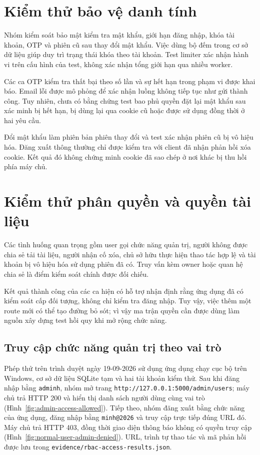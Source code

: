 \section{Kiểm thử bảo vệ danh tính}
Nhóm kiểm soát bảo mật kiểm tra mật khẩu, giới hạn đăng nhập, khóa tài khoản, OTP và phiên cũ sau thay đổi mật khẩu. Việc dùng bộ đếm trong cơ sở dữ liệu giúp duy trì trạng thái khóa theo tài khoản. Test limiter xác nhận hành vi trên cấu hình của test, không xác nhận tổng giới hạn qua nhiều worker.

Các ca OTP kiểm tra thất bại theo số lần và sự hết hạn trong phạm vi được khai báo. Email lỗi được mô phỏng để xác nhận luồng không tiếp tục như gửi thành công. Tuy nhiên, chưa có bằng chứng test bao phủ quyền đặt lại mật khẩu sau xác minh bị hết hạn, bị dùng lại qua cookie cũ hoặc được sử dụng đồng thời ở hai yêu cầu.

Đổi mật khẩu làm phiên bản phiên thay đổi và test xác nhận phiên cũ bị vô hiệu hóa. Đăng xuất thông thường chỉ được kiểm tra với client đã nhận phản hồi xóa cookie. Kết quả đó không chứng minh cookie đã sao chép ở nơi khác bị thu hồi phía máy chủ.

\section{Kiểm thử phân quyền và quyền tài liệu}
Các tình huống quan trọng gồm user gọi chức năng quản trị, người không được chia sẻ tải tài liệu, người nhận cố xóa, chủ sở hữu thực hiện thao tác hợp lệ và tài khoản bị vô hiệu hóa sử dụng phiên đã có. Truy vấn kèm owner hoặc quan hệ chia sẻ là điểm kiểm soát chính được đối chiếu.

Kết quả thành công của các ca hiện có hỗ trợ nhận định rằng ứng dụng đã có kiểm soát cấp đối tượng, không chỉ kiểm tra đăng nhập. Tuy vậy, việc thêm một route mới có thể tạo đường bỏ sót; vì vậy ma trận quyền cần được dùng làm nguồn xây dựng test hồi quy khi mở rộng chức năng.

\subsection{Truy cập chức năng quản trị theo vai trò}
Phép thử trên trình duyệt ngày 19-09-2026 sử dụng ứng dụng chạy cục bộ trên Windows, cơ sở dữ liệu SQLite tạm và hai tài khoản kiểm thử. Sau khi đăng nhập bằng \texttt{adminh}, nhóm mở trang \nolinkurl{http://127.0.0.1:5000/admin/users}; máy chủ trả HTTP 200 và hiển thị danh sách người dùng cùng vai trò (Hình~\ref{fig:admin-access-allowed}). Tiếp theo, nhóm đăng xuất bằng chức năng của ứng dụng, đăng nhập bằng \texttt{minh@2026} và truy cập trực tiếp đúng URL đó. Máy chủ trả HTTP 403, đồng thời giao diện thông báo không có quyền truy cập (Hình~\ref{fig:normal-user-admin-denied}). URL, trình tự thao tác và mã phản hồi được lưu trong \nolinkurl{evidence/rbac-access-results.json}.

